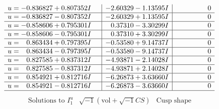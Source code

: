 \documentclass[1p]{elsarticle_modified}
\theoremstyle{definition}
\newcommand{\I}{\sqrt{-1}}
\begin{document}
$$\begin{array}{c|c|c}
\begin{aligned}
u &= -0.836827 + 0.807352 I\end{aligned}
 & -2.60329 - 1.13595 I & \phantom{-0.000000 } 0 \\ \hline\begin{aligned}
u &= -0.836827 - 0.807352 I\end{aligned}
 & -2.60329 + 1.13595 I & \phantom{-0.000000 } 0 \\ \hline\begin{aligned}
u &= -0.858606 + 0.795301 I\end{aligned}
 & \phantom{-}0.37310 - 3.30299 I & \phantom{-0.000000 } 0 \\ \hline\begin{aligned}
u &= -0.858606 - 0.795301 I\end{aligned}
 & \phantom{-}0.37310 + 3.30299 I & \phantom{-0.000000 } 0 \\ \hline\begin{aligned}
u &= \phantom{-}0.863434 + 0.797395 I\end{aligned}
 & -0.53580 + 9.14737 I & \phantom{-0.000000 } 0 \\ \hline\begin{aligned}
u &= \phantom{-}0.863434 - 0.797395 I\end{aligned}
 & -0.53580 - 9.14737 I & \phantom{-0.000000 } 0 \\ \hline\begin{aligned}
u &= \phantom{-}0.827585 + 0.837312 I\end{aligned}
 & -4.93871 - 2.14028 I & \phantom{-0.000000 } 0 \\ \hline\begin{aligned}
u &= \phantom{-}0.827585 - 0.837312 I\end{aligned}
 & -4.93871 + 2.14028 I & \phantom{-0.000000 } 0 \\ \hline\begin{aligned}
u &= \phantom{-}0.854921 + 0.812716 I\end{aligned}
 & -6.26873 + 3.63660 I & \phantom{-0.000000 } 0 \\ \hline\begin{aligned}
u &= \phantom{-}0.854921 - 0.812716 I\end{aligned}
 & -6.26873 - 3.63660 I & \phantom{-0.000000 } 0\\
 \hline 
 \end{array}$$\newpage$$\begin{array}{c|c|c}  
\text{Solutions to }I^u_{1}& \I (\text{vol} + \sqrt{-1}CS) & \text{Cusp shape}\\

\end{array}$$
\end{document}
